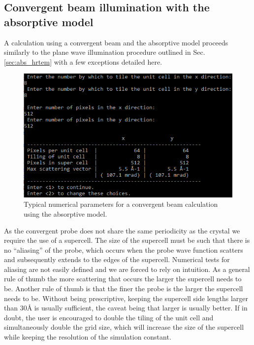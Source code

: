 \documentclass[12pt,a4paper]{article}
\begin{document}
\subsection{Convergent beam illumination with the absorptive model}
\label{abs_stem}

A calculation using a convergent beam and the absorptive model proceeds similarly to the plane wave illumination procedure outlined in Sec. \ref{sec:abs_hrtem} with a few exceptions detailed here.

\begin{figure}[!h]
\begin{center}
    \includegraphics[scale=0.75]{cb_abs_numerical.png}
\caption{Typical numerical parameters for a convergent beam calculation using the absorptive model.}
\label{fig:cb_abs_numerical}
\end{center}
\end{figure}

As the convergent probe does not share the same periodicity as the crystal we require the use of a supercell.
The size of the supercell must be such that there is no ``aliasing'' of the probe, which occurs when the probe wave function scatters and subsequently extends to the edges of the supercell.
Numerical tests for aliasing are not easily defined and we are forced to rely on intuition.
As a general rule of thumb the more scattering that occurs the larger the supercell needs to be.
Another rule of thumb is that the finer the probe is the larger the supercell needs to be.
Without being prescriptive, keeping the supercell side lengths larger than 30{\AA} is usually sufficient, the caveat being that larger is usually better. 
If in doubt, the user is encouraged to double the tiling of the unit cell and simultaneously double the grid size, which will increase the size of the supercell while keeping the resolution of the simulation constant.
\end{document}
